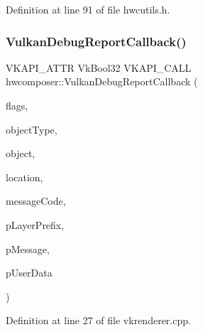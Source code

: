 Definition at line 91 of file hwcutils.\+h.


\begin{DoxyCode}{0}
\end{DoxyCode}
\mbox{\label{namespacehwcomposer_ab5ff410afa97573ec31178666d2d00bb}} 
\subsubsection{\texorpdfstring{Vulkan\+Debug\+Report\+Callback()}{VulkanDebugReportCallback()}}
{\footnotesize\ttfamily V\+K\+A\+P\+I\+\_\+\+A\+T\+TR Vk\+Bool32 V\+K\+A\+P\+I\+\_\+\+C\+A\+LL hwcomposer\+::\+Vulkan\+Debug\+Report\+Callback (\begin{DoxyParamCaption}\item[{Vk\+Debug\+Report\+Flags\+E\+XT}]{flags,  }\item[{Vk\+Debug\+Report\+Object\+Type\+E\+XT}]{object\+Type,  }\item[{uint64\+\_\+t}]{object,  }\item[{size\+\_\+t}]{location,  }\item[{int32\+\_\+t}]{message\+Code,  }\item[{const char $\ast$}]{p\+Layer\+Prefix,  }\item[{const char $\ast$}]{p\+Message,  }\item[{void $\ast$}]{p\+User\+Data }\end{DoxyParamCaption})}



Definition at line 27 of file vkrenderer.\+cpp.


